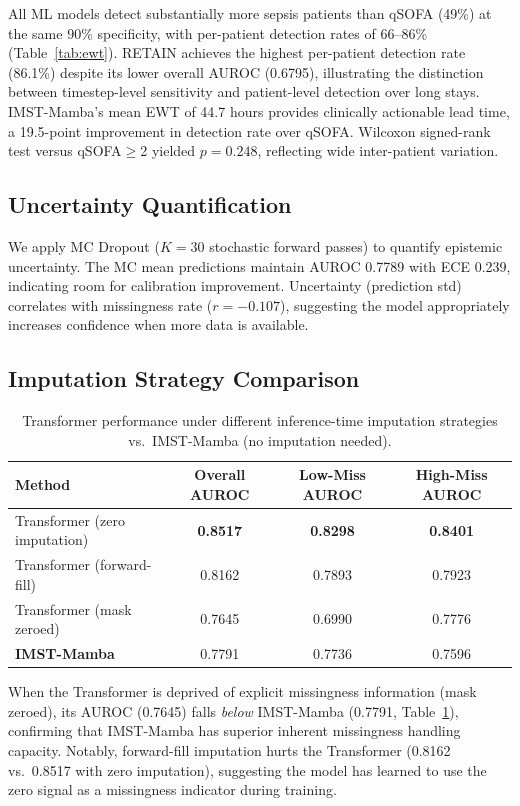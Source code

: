 \documentclass[twoside,11pt]{article}
\begin{document}
All ML models detect substantially more sepsis patients than qSOFA (49\%) at the
same 90\% specificity, with per-patient detection rates of 66--86\%
(Table~\ref{tab:ewt}).  RETAIN achieves the highest per-patient detection rate
(86.1\%) despite its lower overall AUROC (0.6795), illustrating the distinction
between timestep-level sensitivity and patient-level detection over long stays.
IMST-Mamba's mean EWT of 44.7 hours provides clinically actionable lead time, a
19.5-point improvement in detection rate over qSOFA.  Wilcoxon signed-rank test
versus qSOFA$\geq$2 yielded $p=0.248$, reflecting wide inter-patient variation.

\subsection{Uncertainty Quantification}

We apply MC Dropout ($K=30$ stochastic forward passes) to quantify epistemic
uncertainty.  The MC mean predictions maintain AUROC 0.7789 with ECE 0.239,
indicating room for calibration improvement.  Uncertainty (prediction std)
correlates with missingness rate ($r=-0.107$), suggesting the model
appropriately increases confidence when more data is available.

\subsection{Imputation Strategy Comparison}

\begin{table}[t]
\caption{Transformer performance under different inference-time imputation
strategies vs.\ IMST-Mamba (no imputation needed).}
\label{tab:imputation}
\centering
\begin{tabular}{lccc}
\toprule
Method & Overall AUROC & Low-Miss AUROC & High-Miss AUROC \\
\midrule
Transformer (zero imputation)  & \textbf{0.8517} & \textbf{0.8298} & \textbf{0.8401} \\
Transformer (forward-fill)     & 0.8162 & 0.7893 & 0.7923 \\
Transformer (mask zeroed)      & 0.7645 & 0.6990 & 0.7776 \\
\midrule
\textbf{IMST-Mamba}            & 0.7791 & 0.7736 & 0.7596 \\
\bottomrule
\end{tabular}
\end{table}

When the Transformer is deprived of explicit missingness information (mask
zeroed), its AUROC (0.7645) falls \emph{below} IMST-Mamba (0.7791,
Table~\ref{tab:imputation}), confirming that IMST-Mamba has superior inherent
missingness handling capacity.  Notably, forward-fill imputation hurts the
Transformer (0.8162 vs.\ 0.8517 with zero imputation), suggesting the model
has learned to use the zero signal as a missingness indicator during training.
\end{document}

